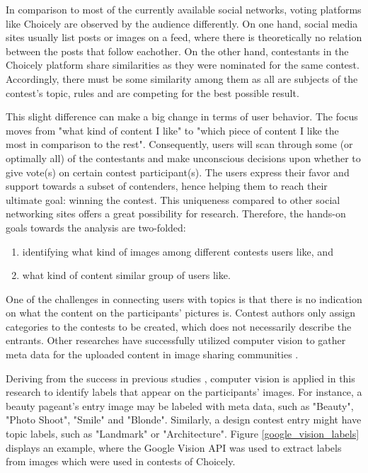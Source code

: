     In comparison to most of the currently available social networks, voting platforms like Choicely are observed by the audience differently. On one hand, social media sites usually list posts or images on a feed, where there is theoretically no relation between the posts that follow eachother. %
    On the other hand, contestants in the Choicely platform share similarities as they were nominated for the same contest. Accordingly, there must be some similarity among them as all are subjects of the contest's topic, rules and are competing for the best possible result. 

    This slight difference can make a big change in terms of user behavior. The focus moves from "what kind of content I like" to "which piece of content I like the most in comparison to the rest". Consequently, users will scan through some (or optimally all) of the contestants and make unconscious decisions upon whether to give vote(s) on certain contest participant(s). The users express their favor and support towards a subset of contenders, hence helping them to reach their ultimate goal: winning the contest. 
    This uniqueness compared to other social networking sites offers a great possibility for research. Therefore, the hands-on goals towards the analysis are two-folded: 

    \begin{enumerate}
        \item identifying what kind of images among different contests users like, and
        \item what kind of content similar group of users like.
    \end{enumerate}

    One of the challenges in connecting users with topics is that there is no indication on what the content on the participants' pictures is. Contest authors only assign categories to the contests to be created, which does not necessarily describe the entrants. Other researches have successfully utilized computer vision to gather meta data for the uploaded content in image sharing communities \cite{bakhshi2014faces, hu2014we}. 
    
    Deriving from the success in previous studies \cite{hu2014we, farseev2015harvestingmultiplesources, han2016teensarefrommars, bakhshi2014faces}, computer vision is applied in this research to identify labels that appear on the participants' images. For instance, a beauty pageant's entry image may be labeled with meta data, such as "Beauty", "Photo Shoot", "Smile" and "Blonde". Similarly, a design contest entry might have topic labels, such as "Landmark" or "Architecture". Figure \ref{google_vision_labels} displays an example, where the Google Vision API was used to extract labels from images which were used in contests of Choicely.

